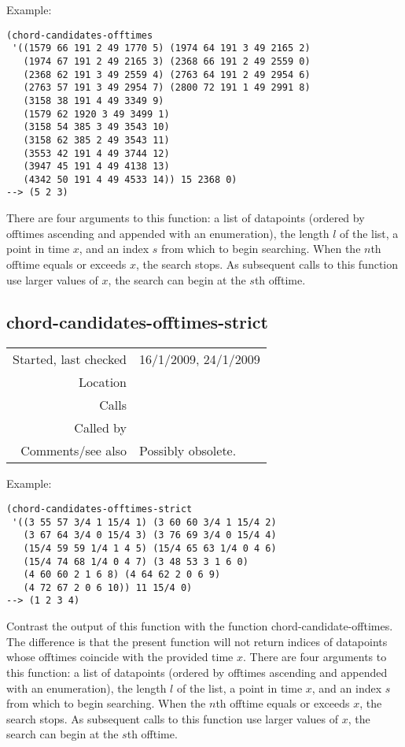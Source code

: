 \vspace{0.5cm}
\noindent Example:
\begin{verbatim}
(chord-candidates-offtimes
 '((1579 66 191 2 49 1770 5) (1974 64 191 3 49 2165 2)
   (1974 67 191 2 49 2165 3) (2368 66 191 2 49 2559 0)
   (2368 62 191 3 49 2559 4) (2763 64 191 2 49 2954 6)
   (2763 57 191 3 49 2954 7) (2800 72 191 1 49 2991 8)
   (3158 38 191 4 49 3349 9)
   (1579 62 1920 3 49 3499 1)
   (3158 54 385 3 49 3543 10)
   (3158 62 385 2 49 3543 11)
   (3553 42 191 4 49 3744 12)
   (3947 45 191 4 49 4138 13)
   (4342 50 191 4 49 4533 14)) 15 2368 0)
--> (5 2 3)
\end{verbatim}

\noindent There are four arguments to this function: a
list of datapoints (ordered by offtimes ascending and
appended with an enumeration), the length $l$ of the
list, a point in time $x$, and an index $s$ from which
to begin searching. When the $n$th offtime equals or
exceeds $x$, the search stops. As subsequent calls to
this function use larger values of $x$, the search can
begin at the $s$th offtime.


\subsection*{chord-candidates-offtimes-strict}\label{fun:chord-candidates-offtimes-strict}

\vspace{0.3cm}
\begin{tabular}{r|p{8cm}}
Started, last checked & 16/1/2009, 24/1/2009 \\
Location & \nameref{sec:segmentation} \\
Calls & \nameref{fun:my-last} \\
Called by & \nameref{fun:segment-strict} \\
Comments/see also & Possibly obsolete.
\end{tabular}

\vspace{0.5cm}
\noindent Example:
\begin{verbatim}
(chord-candidates-offtimes-strict
 '((3 55 57 3/4 1 15/4 1) (3 60 60 3/4 1 15/4 2)
   (3 67 64 3/4 0 15/4 3) (3 76 69 3/4 0 15/4 4)
   (15/4 59 59 1/4 1 4 5) (15/4 65 63 1/4 0 4 6)
   (15/4 74 68 1/4 0 4 7) (3 48 53 3 1 6 0)
   (4 60 60 2 1 6 8) (4 64 62 2 0 6 9)
   (4 72 67 2 0 6 10)) 11 15/4 0)
--> (1 2 3 4)
\end{verbatim}

\noindent Contrast the output of this function with
the function chord-candidate-offtimes. The difference
is that the present function will not return indices
of datapoints whose offtimes coincide with the
provided time $x$. There are four arguments to this
function: a list of datapoints (ordered by offtimes
ascending and appended with an enumeration), the
length $l$ of the list, a point in time $x$, and an
index $s$ from which to begin searching. When the
$n$th offtime equals or exceeds $x$, the search stops.
As subsequent calls to this function use larger values
of $x$, the search can begin at the $s$th offtime.


